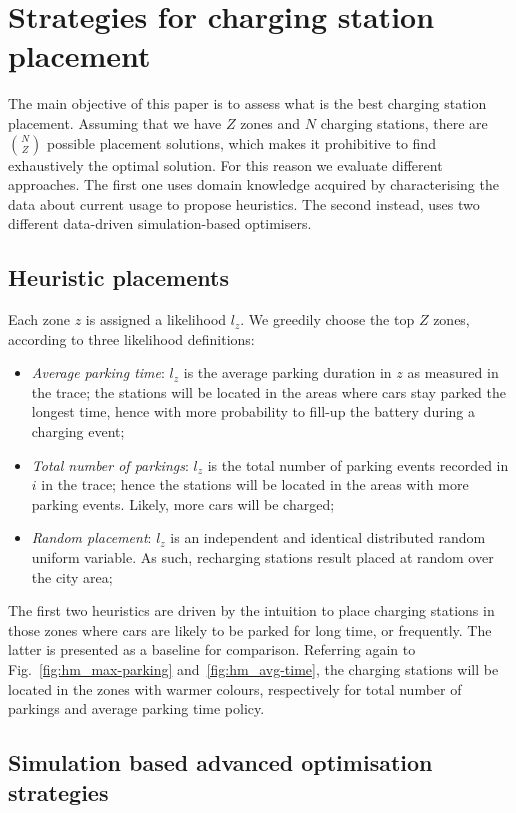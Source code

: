 \section{Strategies for charging station placement}\label{sec:placement}

The main objective of this paper is to assess what is the best charging station placement. Assuming that we have $Z$ zones and $N$ charging stations, there are ${N}\choose{Z}$ possible placement solutions, which makes it prohibitive to find exhaustively the optimal solution. For this reason we evaluate different approaches. The first one uses domain knowledge acquired by characterising the data about current usage to propose heuristics. The second instead, uses two different data-driven simulation-based optimisers.

\subsection{Heuristic placements}

Each zone $z$ is assigned a likelihood $l_z$. We greedily choose the top $Z$ zones, according to three likelihood definitions:
\begin{itemize}
\item{\it Average parking time}: $l_z$ is the average parking duration in $z$ as measured in the trace; the stations will be located in the areas where cars stay parked the longest time, hence with more probability to fill-up the battery during a charging event;
\item{\it Total number of parkings}: $l_z$ is the total number of parking events recorded in $i$ in the trace; hence the stations will be located in the areas with more parking events. Likely, more cars will be charged;
\item{\it Random placement}: $l_z$ is an independent and identical distributed random uniform variable. As such, recharging stations result placed at random over the city area;
\end{itemize}
The first two heuristics are driven by the intuition to place charging stations in those zones where cars are likely to be parked for long time, or frequently. The latter is presented as a baseline for comparison. Referring again to Fig.~\ref{fig:hm_max-parking} and~\ref{fig:hm_avg-time}, the charging stations will be located in the zones with warmer colours, respectively for total number of parkings and average parking time policy.

\subsection{Simulation based advanced optimisation strategies}\label{sec:optmizers}

